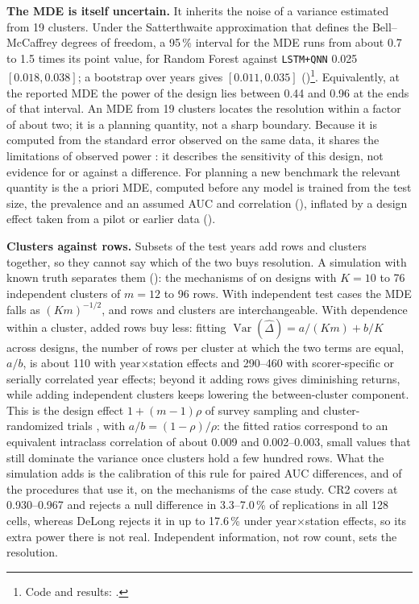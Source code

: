 \documentclass[11pt,a4paper]{article}
\begin{document}
\textbf{The MDE is itself uncertain.} It inherits the noise of a variance estimated from 19 clusters. Under the Satterthwaite approximation that defines the Bell--McCaffrey degrees of freedom, a 95\,\% interval for the MDE runs from about 0.7 to 1.5 times its point value, for Random Forest against \texttt{LSTM+QNN} 0.025 $[0.018,0.038]$; a bootstrap over years gives $[0.011,0.035]$ ()\footnote{Code and results: .}. Equivalently, at the reported MDE the power of the design lies between 0.44 and 0.96 at the ends of that interval. An MDE from 19 clusters locates the resolution within a factor of about two; it is a planning quantity, not a sharp boundary. Because it is computed from the standard error observed on the same data, it shares the limitations of observed power \citep{hoenig2001}: it describes the sensitivity of this design, not evidence for or against a difference. For planning a new benchmark the relevant quantity is the a priori MDE, computed before any model is trained from the test size, the prevalence and an assumed AUC and correlation (), inflated by a design effect taken from a pilot or earlier data ().

\textbf{Clusters against rows.} Subsets of the test years add rows and clusters together, so they cannot say which of the two buys resolution. A simulation with known truth separates them (): the mechanisms of  on designs with $K=10$ to 76 independent clusters of $m=12$ to 96 rows. With independent test cases the MDE falls as $(Km)^{-1/2}$, and rows and clusters are interchangeable. With dependence within a cluster, added rows buy less: fitting $\operatorname{Var}(\hat\Delta)=a/(Km)+b/K$ across designs, the number of rows per cluster at which the two terms are equal, $a/b$, is about 110 with year$\times$station effects and 290--460 with scorer-specific or serially correlated year effects; beyond it adding rows gives diminishing returns, while adding independent clusters keeps lowering the between-cluster component. This is the design effect $1+(m-1)\rho$ of survey sampling and cluster-randomized trials \citep{kish1965,donner2000}, with $a/b=(1-\rho)/\rho$: the fitted ratios correspond to an equivalent intraclass correlation of about 0.009 and 0.002--0.003, small values that still dominate the variance once clusters hold a few hundred rows. What the simulation adds is the calibration of this rule for paired AUC differences, and of the procedures that use it, on the mechanisms of the case study. CR2 covers at 0.930--0.967 and rejects a null difference in 3.3--7.0\,\% of replications in all 128 cells, whereas DeLong rejects it in up to 17.6\,\% under year$\times$station effects, so its extra power there is not real. Independent information, not row count, sets the resolution.
\end{document}
